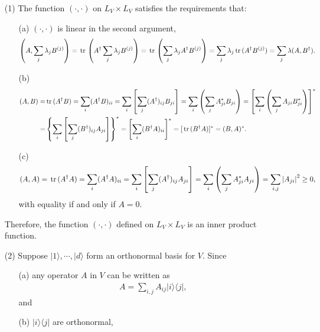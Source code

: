 \documentclass[en]{sol-man}
\begin{document}
\begin{sol}
    \begin{itemize}
        \item[(1)] The function $(\cdot,\cdot)$ on $L_V\times L_V$ satisfies the requirements that:
        \begin{itemize}
            \item[(a)] $(\cdot,\cdot)$ is linear in the second argument,
            \begin{align}
                \left(A,\sum_j\lambda_jB^{(j)}\right)=\,\mathrm{tr}\,\left(A^{\dagger}\sum_j\lambda_jB^{(j)}\right)=\,\mathrm{tr}\,\left(\sum_j\lambda_jA^{\dagger}B^{(j)}\right)=\sum_j\lambda_j\,\mathrm{tr}\,(A^{\dagger}B^{(j)})=\sum_j\lambda(A,B^{\dagger}).
            \end{align}
            \item[(b)] 
            \begin{align}
                \notag(A,B)=&\,\mathrm{tr}\,(A^{\dagger}B)=\sum_i(A^{\dagger}B)_{ii}=\sum_i\left[\sum_j(A^{\dagger})_{ij}B_{ji}\right]=\sum_i\left(\sum_jA_{ji}^*B_{ji}\right)=\left[\sum_i\left(\sum_jA_{ji}B_{ji}^*\right)\right]^*\\
                =&\left\{\sum_i\left[\sum_j(B^{\dagger})_{ij}A_{ji}\right]\right\}^*=\left[\sum_i(B^{\dagger}A)_{ii}\right]^*=[\,\mathrm{tr}\,(B^{\dagger}A)]^*=(B,A)^*.
            \end{align}
            \item[(c)] 
            \begin{align}
                (A,A)=\,\mathrm{tr}\,(A^{\dagger}A)=\sum_i(A^{\dagger}A)_{ii}=\sum_i\left[\sum_j(A^{\dagger})_{ij}A_{ji}\right]=\sum_i\left(\sum_jA_{ji}^*A_{ji}\right)=\sum_{i,j}\left\lvert A_{ji}\right\rvert^2\geq 0,
            \end{align}
            with equality if and only if $A=0$.
        \end{itemize}
        Therefore, the function $(\cdot,\cdot)$ defined on $L_V\times L_V$ is an inner product function.
        \item[(2)] Suppose $\lvert 1\rangle,\cdots,\lvert d\rangle$ form an orthonormal basis for $V$. Since
        \begin{itemize}
            \item[(a)] any operator $A$ in $V$ can be written as
            \begin{align}
                A=\sum_{i,j}A_{ij}\lvert i\rangle\langle j\rvert,
            \end{align}
            and
            \item[(b)] $\lvert i\rangle\langle j\rvert$ are orthonormal,

\end{itemize}
\end{itemize}
\end{sol}
\end{document}
